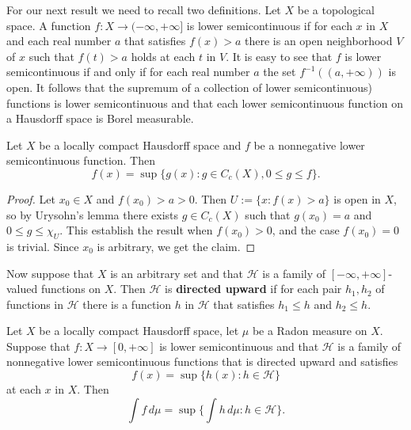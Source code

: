For our next result we need to recall two definitions. Let $X$ be a topological space. A function $f:X\to(-\infty,+\infty]$ is lower semicontinuous if for each $x$ in $X$ and each real number $a$ that satisfies $f(x)>a$ there is an open neighborhood $V$ of $x$ such that $f(t)>a$ holds at each $t$ in $V$. It is easy to see that $f$ is lower semicontinuous if and only if for each real number $a$ the set $f^{-1}((a,+\infty))$ is open. It follows that the supremum of a collection of lower semicontinuous) functions is lower semicontinuous and that each lower semicontinuous function on a Hausdorff space is Borel measurable.
\begin{proposition}\label{LCH LSC approximated by C_c(X)}
Let $X$ be a locally compact Hausdorff space and $f$ be a nonnegative lower semicontinuous function. Then
\[f(x)=\sup\{g(x):g\in C_c(X),0\leq g\leq f\}.\]
\end{proposition}
\begin{proof}
Let $x_0\in X$ and $f(x_0)>a>0$. Then $U:=\{x:f(x)>a\}$ is open in $X$, so by Urysohn's lemma there exists $g\in C_c(X)$ such that $g(x_0)=a$ and $0\leq g\leq\chi_U$. This establish the result when $f(x_0)>0$, and the case $f(x_0)=0$ is trivial. Since $x_0$ is arbitrary, we get the claim.
\end{proof}
Now suppose that $X$ is an arbitrary set and that $\mathscr{H}$ is a family of $[-\infty,+\infty]$-valued functions on $X$. Then $\mathscr{H}$ is \textbf{directed upward} if for each pair $h_1,h_2$ of functions in $\mathscr{H}$ there is a function $h$ in $\mathscr{H}$ that satisfies $h_1\leq h$ and $h_2\leq h$.
\begin{proposition}\label{Radon monotone convergence for LSC}
Let $X$ be a locally compact Hausdorff space, let $\mu$ be a Radon measure on $X$. Suppose that $f:X\to[0,+\infty]$ is lower semicontinuous and that $\mathscr{H}$ is a family of nonnegative lower semicontinuous functions that is directed upward and satisfies
\[f(x)=\sup\{h(x):h\in\mathscr{H}\}\]
at each $x$ in $X$. Then
\[\int f\,d\mu=\sup\{\int h\,d\mu:h\in\mathscr{H}\}.\]
\end{proposition}
